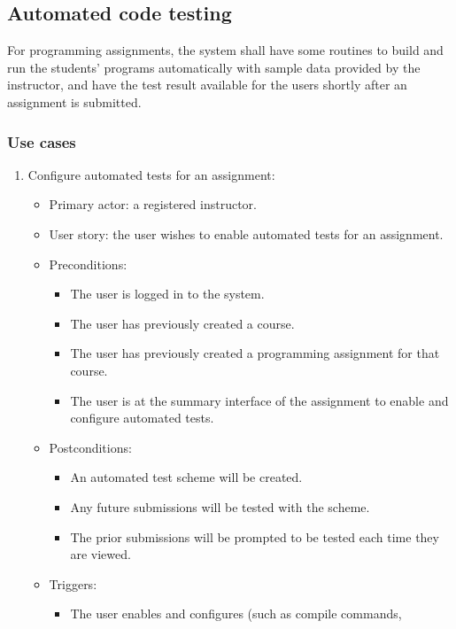 \subsection{Automated code testing}
\label{sec:AUTOTEST}
For programming assignments, the system shall have some routines to build and
run the students' programs automatically with sample data provided by the
instructor, and have the test result available for the users shortly after an
assignment is submitted.

\subsubsection{Use cases}
\begin{enumerate}
\item Configure automated tests for an assignment:
\begin{itemize}
    \item Primary actor: a registered instructor.
    \item User story: the user wishes to enable automated tests for an
        assignment.
    \item Preconditions:
        \begin{itemize}
            \item The user is logged in to the system.
            \item The user has previously created a course.
            \item The user has previously created a programming assignment for
                that course.
            \item The user is at the summary interface of the assignment to
                enable and configure automated tests.
        \end{itemize}
    \item Postconditions:
        \begin{itemize}
            \item An automated test scheme will be created.
            \item Any future submissions will be tested with the scheme.
            \item The prior submissions will be prompted to be tested each time
                they are viewed.
        \end{itemize}
    \item Triggers:
        \begin{itemize}
            \item The user enables and configures (such as compile commands, 

\end{itemize}
\end{itemize}
\end{enumerate}
